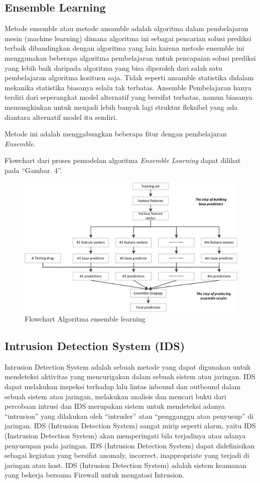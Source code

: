 \documentclass[conference]{IEEEtran}
\begin{document}
\subsection{Ensemble Learning}

Metode ensemble atau metode ansamble adalah algoritma dalam pembelajaran mesin (machine learning) dimana algoritma ini sebagai pencarian solusi prediksi terbaik dibandingkan dengan algoritma yang lain karena metode ensemble ini menggunakan beberapa algoritma pembelajaran untuk pencapaian solusi prediksi yang lebih baik daripada algoritma yang bisa diperoleh dari salah satu pembelajaran algoritma kosituen saja. Tidak seperti ansamble statistika didalam mekanika statistika biasanya selalu tak terbatas. Ansemble Pembelajaran hanya terdiri dari seperangkat model alternatif yang bersifat terbatas, namun biasanya memungkinkan untuk menjadi lebih banyak lagi struktur fleksibel yang ada diantara alternatif model itu sendiri.

Metode ini adalah menggabungkan beberapa fitur dengan pembelajaran \emph{Ensemble}.

Flowchart dari proses pemodelan algoritma \emph{Ensemble Learning} dapat dilihat pada ``Gambar. 4''.\vspace{6pt}

\begin{figure}
\centering
\includegraphics[width=.4\textwidth]{Gambar/gambar4.png}
\caption{Flowchart Algoritma ensemble learning}
\end{figure}

\subsection{ Intrusion Detection System (IDS)}\label{IDS}

Intrusion Detection System adalah sebuah metode yang dapat digunakan untuk mendeteksi aktivitas yang mencurigakan dalam sebuah sistem atau jaringan. IDS dapat melakukan inspeksi terhadap lalu lintas inbound dan outbound dalam sebuah sistem atau jaringan, melakukan analisis dan mencari bukti dari percobaan intrusi dan IDS merupakan sistem untuk mendeteksi adanya “intrusion”
yang dilakukan oleh “intruder” atau “pengganggu atau
penyusup” di jaringan. IDS (Intrusion Detection System)
sangat mirip seperti alarm, yaitu IDS (Instrusion Detection System) akan memperingati bila terjadinya atau adanya
penyusupan pada jaringan. IDS (Intrusion Detection System)
dapat didefinisikan sebagai kegiatan yang bersifat anomaly,
incorrect, inappropriate yang terjadi di jaringan atau host. IDS
(Intrusion Detection System) adalah sistem keamanan yang
bekerja bersama Firewall untuk mengatasi Intrusion.
\end{document}
